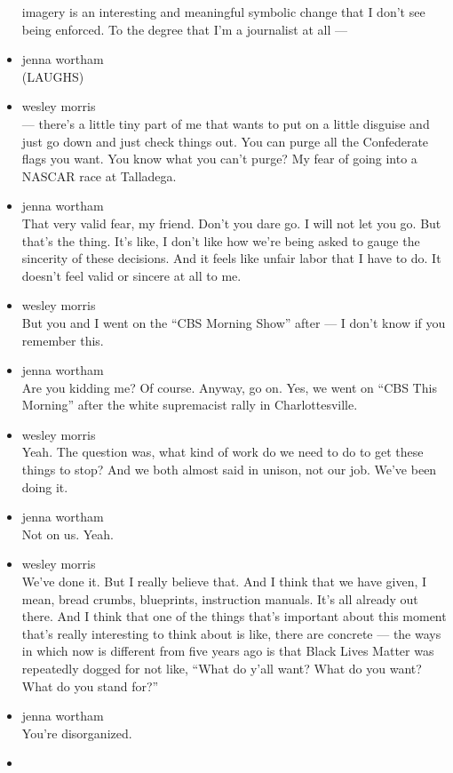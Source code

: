 \begin{itemize}
  imagery is an interesting and meaningful symbolic change that I don't
  see being enforced. To the degree that I'm a journalist at all ---
\item
  jenna wortham\\
  (LAUGHS)
\item
  wesley morris\\
  --- there's a little tiny part of me that wants to put on a little
  disguise and just go down and just check things out. You can purge all
  the Confederate flags you want. You know what you can't purge? My fear
  of going into a NASCAR race at Talladega.
\item
  jenna wortham\\
  That very valid fear, my friend. Don't you dare go. I will not let you
  go. But that's the thing. It's like, I don't like how we're being
  asked to gauge the sincerity of these decisions. And it feels like
  unfair labor that I have to do. It doesn't feel valid or sincere at
  all to me.
\item
  wesley morris\\
  But you and I went on the ``CBS Morning Show'' after --- I don't know
  if you remember this.
\item
  jenna wortham\\
  Are you kidding me? Of course. Anyway, go on. Yes, we went on ``CBS
  This Morning'' after the white supremacist rally in Charlottesville.
\item
  wesley morris\\
  Yeah. The question was, what kind of work do we need to do to get
  these things to stop? And we both almost said in unison, not our job.
  We've been doing it.
\item
  jenna wortham\\
  Not on us. Yeah.
\item
  wesley morris\\
  We've done it. But I really believe that. And I think that we have
  given, I mean, bread crumbs, blueprints, instruction manuals. It's all
  already out there. And I think that one of the things that's important
  about this moment that's really interesting to think about is like,
  there are concrete --- the ways in which now is different from five
  years ago is that Black Lives Matter was repeatedly dogged for not
  like, ``What do y'all want? What do you want? What do you stand for?''
\item
  jenna wortham\\
  You're disorganized.
\item

\end{itemize}
